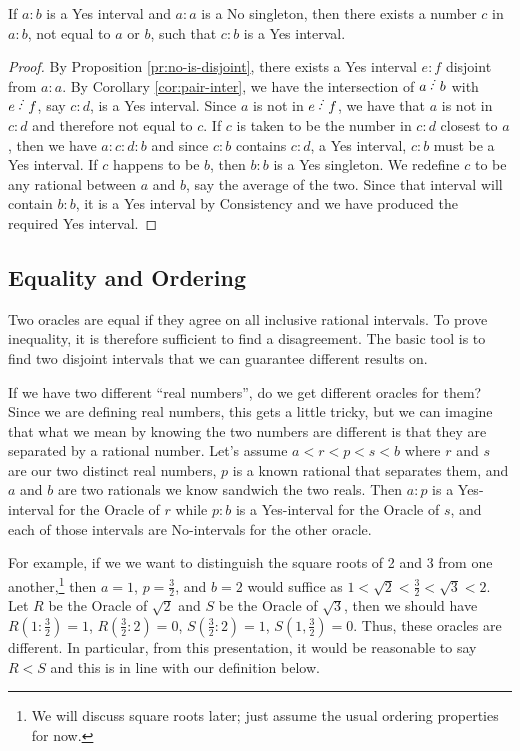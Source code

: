 \documentclass[12pt]{article}
\begin{document}
\begin{corollary}\label{cor:exclude-singleton}
    If $a : b$ is a Yes interval and $a:a$ is a No singleton, then there exists a number $c$ in $a:b$, not equal to $a$ or $b$, such that $c : b$ is a Yes interval.
\end{corollary}

\begin{proof}
    By Proposition \ref{pr:no-is-disjoint}, there exists a Yes interval $e : f$ disjoint from $a:a$. By Corollary \ref{cor:pair-inter}, we have the intersection of $a\lte b$ with $e\lte f$, say $c:d$, is a Yes interval. Since $a$ is not in $e\lte f$, we have that $a$ is not in $c:d$ and therefore not equal to $c$.  If $c$ is taken to be the number in $c:d$ closest to $a$, then we have $a:c:d:b$ and since $c:b$ contains $c:d$, a Yes interval, $c:b$ must be a Yes interval.  If $c$ happens to be $b$, then $b:b$ is a Yes singleton. We redefine $c$ to be any rational between $a$ and $b$, say the average of the two. Since that interval will contain $b:b$, it is a Yes interval by Consistency and we have produced the required Yes interval. 
\end{proof}

\subsection{Equality and Ordering}

Two oracles are equal if they agree on all inclusive rational intervals. To prove inequality, it is therefore sufficient to find a disagreement. The basic tool is to find two disjoint intervals that we can guarantee different results on. 

If we have two different ``real numbers'', do we get different oracles for them? Since we are defining real numbers, this gets a little tricky, but we can imagine that what we mean by knowing the two numbers are different is that they are separated by a rational number. Let's assume $a < r < p < s < b$ where $r$ and $s$ are our two distinct real numbers,  $p$ is a known rational that separates them, and $a$ and $b$ are two rationals we know sandwich the two reals. Then $a:p$ is a Yes-interval for the Oracle of $r$ while $p:b$ is a Yes-interval for the Oracle of $s$, and each of those intervals are No-intervals for the other oracle. 

For example, if we we want to distinguish the square roots of 2 and 3 from one another,\footnote{We will discuss square roots later; just assume the usual ordering properties for now.} then $a = 1$, $p = \tfrac{3}{2}$, and $b = 2$ would suffice as $1 < \sqrt{2} < \tfrac{3}{2} < \sqrt{3} < 2$. Let $R$ be the Oracle of $\sqrt{2}$ and $S$ be the Oracle of $\sqrt{3}$, then we should have $R(1:\tfrac{3}{2}) = 1$, $R(\tfrac{3}{2}:2) = 0$,  $S(\tfrac{3}{2}:2) = 1$, $S(1, \tfrac{3}{2}) = 0$. Thus, these oracles are different. In particular, from this presentation, it would be reasonable to say $R < S$ and this is in line with our definition below.
\end{document}
